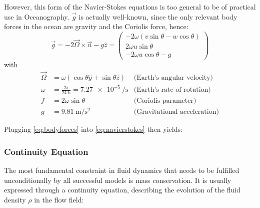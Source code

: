 However, this form of the Navier-Stokes equations is too general to be of practical use in Oceanography. \(\vec{g}\) is actually well-known, since the only relevant body forces in the ocean are gravity and the Coriolis force, hence:
%
\begin{equation} 
\label{eq:bodyforces}
\vec{g} = - 2\vec{\Omega} \times \vec{u} - g \hat{z} 
= \begin{pmatrix} -2\omega(v \sin\theta - w \cos\theta) \\ 2\omega u \sin\theta \\ -2\omega u \cos\theta - g \end{pmatrix}
\end{equation}
%
with
%
\begin{align}
\vec{\Omega} &= \omega (\cos\theta \hat{y} + \sin\theta \hat{z}) & \text{(Earth's angular velocity)} \\
\omega &= \frac{2\pi}{\SI{24}{\hour}} = \SI{7.27e-5}{\per\second}  & \text{(Earth's rate of rotation)} \\
f &= 2 \omega \sin\theta & \text{(Coriolis parameter)} \\
g &= \SI{9.81}{\metre\per\second^2} & \text{(Gravitational acceleration)}
\end{align}

Plugging \eqref{eq:bodyforces} into \eqref{eq:navierstokes} then yields:
%

\subsubsection{Continuity Equation}
The most fundamental constraint in fluid dynamics that needs to be fulfilled unconditionally by all successful models is mass conservation. It is usually expressed through a continuity equation, describing the evolution of the fluid density \(\rho\) in the flow field:
%

